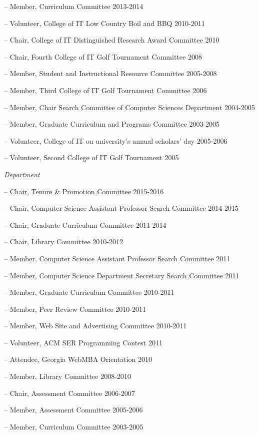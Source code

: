 \documentclass[10pt]{article}
\begin{document}
\begin{outerlist}
           \begin{innerlist}
		\item[--] Member, Curriculum Committee  \hfill{2013-2014}
		\item[--] Volunteer, College of IT Low Country Boil and BBQ  \hfill{2010-2011}
		\item[--] Chair, College of IT Distinguished Research Award Committee \hfill{2010}
		\item[--] Chair, Fourth College of IT Golf Tournament Committee  \hfill{2008}
		\item[--] Member, Student and Instructional Resource Committee  \hfill{2005-2008}
		\item[--] Member, Third College of IT Golf Tournament Committee  \hfill{2006}
		\item[--] Member, Chair Search Committee of Computer Sciences Department  \hfill{2004-2005}
		\item[--] Member, Graduate Curriculum and Programs Committee  \hfill{2003-2005}
		\item[--] Volunteer, College of IT on university's annual scholars' day \hfill{2005-2006}
		\item[--] Volunteer, Second College of IT Golf Tournament  \hfill{2005}
           \end{innerlist}

    \item[] \textit{Department}
    
           \begin{innerlist}
		\item[--] Chair, Tenure \& Promotion Committee \hfill{2015-2016}
		\item[--] Chair, Computer Science Assistant Professor Search Committee \hfill{2014-2015}
		\item[--] Chair, Graduate Curriculum Committee \hfill{2011-2014}
		\item[--] Chair, Library Committee \hfill{2010-2012}
		\item[--] Member, Computer Science Assistant Professor Search Committee \hfill{2011}
		\item[--] Member, Computer Science Department Secretary Search Committee \hfill{2011}
		\item[--] Member, Graduate Curriculum Committee \hfill{2010-2011}
		\item[--] Member, Peer Review Committee \hfill{2010-2011}
		\item[--] Member, Web Site and Advertising Committee \hfill{2010-2011}
		\item[--] Volunteer, ACM SER Programming Contest \hfill{2011}
		\item[--] Attendee, Georgia WebMBA Orientation \hfill{2010}
		\item[--] Member, Library Committee \hfill{2008-2010}
		\item[--] Chair, Assessment Committee \hfill{2006-2007}
		\item[--] Member, Assessment Committee \hfill{2005-2006}
		\item[--] Member, Curriculum Committee \hfill{2003-2005}
           \end{innerlist}


\end{outerlist}
\end{document}
